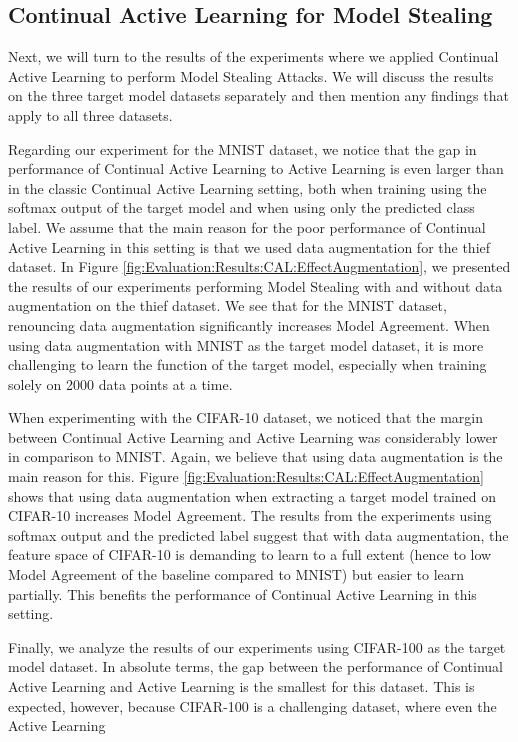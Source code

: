 \subsection{Continual Active Learning for Model Stealing}
\label{sec:Discussion:ModelStealing:CALMS}
Next, we will turn to the results of the experiments where we applied Continual Active Learning to perform Model Stealing Attacks. We will discuss the results on the
three target model datasets separately and then mention any findings that apply to all three datasets. \par
Regarding our experiment for the MNIST dataset, we notice that the gap in performance of Continual Active Learning to Active Learning is even larger than in the
classic Continual Active Learning setting, both when training using the softmax output of the target model and when using only the predicted class label. We assume that
the main reason for the poor performance of Continual Active Learning in this setting is that we used data augmentation for the thief dataset. In Figure 
\ref{fig:Evaluation:Results:CAL:EffectAugmentation}, we presented the results of our experiments performing Model Stealing with and without data augmentation on the
thief dataset. We see that for the MNIST dataset, renouncing data augmentation significantly increases Model Agreement. When using data augmentation with MNIST as
the target model dataset, it is more challenging to learn the function of the target model, especially when training solely on 2000 data points at a time. \par
When experimenting with the CIFAR-10 dataset, we noticed that the margin between Continual Active Learning and Active Learning was considerably lower in comparison to
MNIST. Again, we believe that using data augmentation is the main reason for this. Figure \ref{fig:Evaluation:Results:CAL:EffectAugmentation} shows that using data
augmentation when extracting a target model trained on CIFAR-10 increases Model Agreement. The results from the experiments using softmax output and the predicted label
suggest that with data augmentation, the feature space of CIFAR-10 is demanding to learn to a full extent (hence to low Model Agreement of the baseline compared to MNIST)
but easier to learn partially. This benefits the performance of Continual Active Learning in this setting. \par
Finally, we analyze the results of our experiments using CIFAR-100 as the target model dataset. In absolute terms, the gap between the performance of Continual Active
Learning and Active Learning is the smallest for this dataset. This is expected, however, because CIFAR-100 is a challenging dataset, where even the Active Learning
